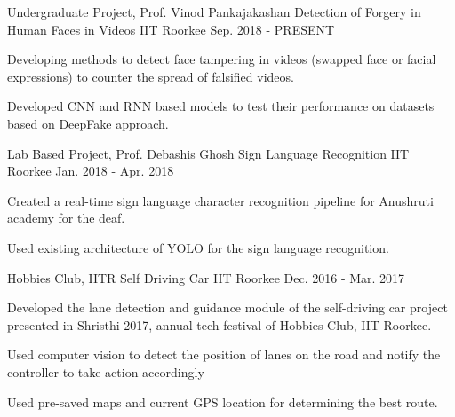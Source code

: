 

\begin{cventries}

  \cventry
    {Undergraduate Project, Prof. Vinod Pankajakashan} %
    {Detection of Forgery in Human Faces in Videos} %
    {IIT Roorkee} %
    {Sep. 2018 - PRESENT} %
    {
      \begin{cvitems} %
        \item {Developing methods to detect face tampering in videos (swapped face or facial expressions) to counter the
spread of falsified videos.}
        \item {Developed CNN and RNN based models to test their performance on datasets based on DeepFake approach.}
      \end{cvitems}
    }

  \cventry
    {Lab Based Project, Prof. Debashis Ghosh } %
    {Sign Language Recognition} %
    {IIT Roorkee} %
    {Jan. 2018 - Apr. 2018} %
    {
      \begin{cvitems} %
        \item {Created a real-time sign language character recognition pipeline for Anushruti academy for the deaf.}
        \item {Used existing architecture of YOLO for the sign language recognition.}
      \end{cvitems}
    }

  \cventry
    {Hobbies Club, IITR } %
    {Self Driving Car} %
    {IIT Roorkee} %
    {Dec. 2016 - Mar. 2017} %
    {
      \begin{cvitems} %
        \item {Developed the lane detection and guidance module of the self-driving car project presented in Shristhi 2017, annual tech
festival of Hobbies Club, IIT Roorkee.}
        \item {Used computer vision to detect the position of lanes on the road and notify the controller to take action accordingly}
        \item {Used pre-saved maps and current GPS location for determining the best route.}
      \end{cvitems}
    }


\end{cventries}

